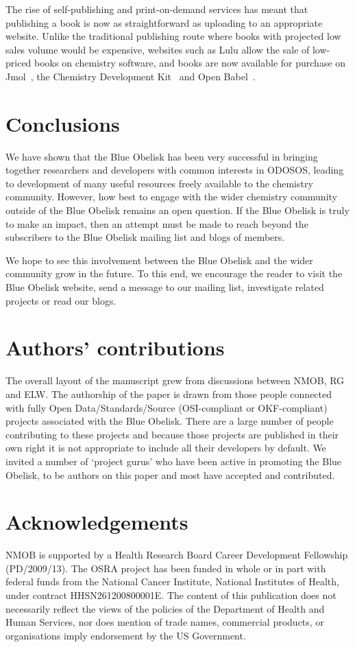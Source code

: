 \documentclass[10pt]{bmc_article}
\newenvironment{bmcformat}{\begin{raggedright}\baselineskip20pt\sloppy\setboolean{publ}{false}}{\end{raggedright}\baselineskip20pt\sloppy}
\begin{document}
\begin{bmcformat}
The rise of self-publishing and print-on-demand services has meant
that publishing a book is now as straightforward as uploading to an
appropriate website. Unlike the traditional publishing route where
books with projected low sales volume would be expensive,
websites such as Lulu\cite{WebLulu} allow the sale of low-priced books on
chemistry software, and books are now available for purchase
on Jmol~\cite{JmolBook}, the Chemistry Development Kit~\cite{CDKBook}
and Open Babel~\cite{Open BabelBook}.

\section*{Conclusions}

We have shown that the Blue Obelisk has been very successful
in bringing together researchers and developers with common interests
in ODOSOS, leading to development of many useful resources freely
available to the chemistry community. However, how best to engage with the
wider chemistry community outside of the Blue Obelisk remains an open
question. If the Blue Obelisk is truly to make an impact,
then an attempt must be made to reach beyond the subscribers to the
Blue Obelisk mailing list and blogs of members.

We hope to see this involvement between the Blue Obelisk and the wider
community grow in the future. To this end, we encourage the reader to
visit the Blue Obelisk website\cite{WebBlueObelisk}, send a message to our mailing list,
investigate related projects or read our blogs.


\section*{Authors' contributions}
The overall layout of the manuscript grew from discussions between NMOB, RG and ELW. The authorship of the paper is drawn from those people connected with fully Open Data/Standards/Source (OSI-compliant or OKF-compliant) projects associated with the Blue Obelisk. There are a large number of people contributing to these projects and because those projects are published in their own right it is not appropriate to include all their developers by default. We invited a number of `project gurus' who have been active in promoting the Blue Obelisk, to be authors on this paper and most have accepted and contributed.

\section*{Acknowledgements}
  NMOB is supported by a Health Research Board Career Development
Fellowship (PD/2009/13).
The OSRA project has been funded in whole or in part with federal funds from
the National Cancer Institute, National Institutes of Health, under
contract HHSN261200800001E. The content of this publication does not
necessarily reflect the views of the policies of the Department of
Health and Human Services, nor does mention of trade names, commercial
products, or organisations imply endorsement by the US Government.


\end{bmcformat}
\end{document}
